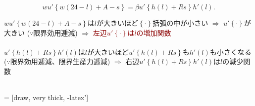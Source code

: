 \begin{frame}{}
\[
wu'\left\{w(24-l)+A-s\right\}=\beta u'\left\{h(l)+Rs\right\}h'(l).
\]

\vspace{3ex}
$wu'\left\{w(24-l)+A-s\right\}$は$l$が大きいほど$\left\{\cdot\right\}$括弧の中が小さい $\Rightarrow$ $u'\left\{\cdot\right\}$が大きい ($\because$限界効用逓減) $\Rightarrow$ \textcolor{darkred}{左辺$u'\left\{\cdot\right\}$は$l$の増加関数}\\~\\
$u'\left\{h(l)+Rs\right\}h'(l)$は$l$が大きいほど$u'\left\{h(l)+Rs\right\}$も$h'(l)$も小さくなる ($\because$限界効用逓減、限界生産力逓減) $\Rightarrow$ \textcolor{green!80}{右辺$u'\left\{h(l)+Rs\right\}h'(l)$は$l$の減少関数}\\~\\
\end{frame}


\def\xlow{3.83}
\def\xadd{1.87}
\def\xpivot{3.2}
\def\xpivothalf{1.6}
\def\xpivothalftwo{5.6}
\def\xright2{4}
\def\Xlim{12}
\def\Ylim{8}
\def\Ylimtwo{12}
\def\yminus{-.25}

\def\ProdFunction{(0, 7) to [out=-10, in=170] (6.5, \xright2) }
\def\afterline{(0, 4) to [out=20, in=190] (\Xlim-1, 7)}
 = [draw, very thick, -latex']

